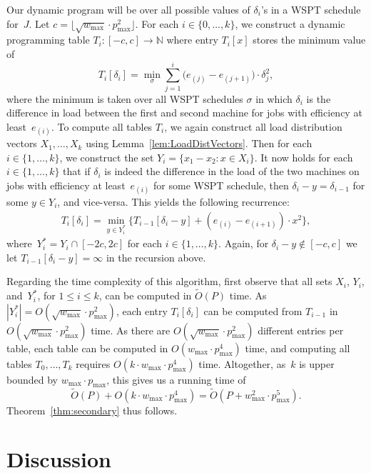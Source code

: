 \documentclass[11pt]{llncs}
\begin{document}
Our dynamic program will be over all possible values of $\delta_i$'s in a WSPT schedule for~$J$. Let $c = \lfloor \sqrt{w_{\max}} \cdot p^2_{\max} \rfloor$. For each $i \in \{0,\ldots,k\}$, we construct a dynamic programming table $T_i:[-c,c] \to \mathbb{N}$ where entry $T_i[x]$ stores the minimum value of
$$
T_i[\delta_i] = \min_{\sigma} \sum_{j = 1}^{i}   \big(e_{(j)}-e_{(j+1)}\big)  \cdot  \delta^2_j,
$$ 
where the minimum is taken over all WSPT schedules $\sigma$ in which $\delta_i$ is the difference in load between the first and second machine for jobs with efficiency at least~$e_{(i)}$. To compute all tables $T_i$, we again construct all load distribution vectors $X_1,\ldots,X_k$ using Lemma~\ref{lem:LoadDistVectors}. Then for each $i \in \{1,\ldots,k\}$, we construct the set $Y_i=\{x_1 - x_2 : x \in X_i\}$. It now holds for each $i \in \{1,\ldots,k\}$ that if $\delta_i$ is indeed the difference in the load of the two machines on jobs with efficiency at least~$e_{(i)}$ for some WSPT schedule, then $\delta_i - y= \delta_{i-1}$ for some $y \in Y_i$, and vice-versa. This yields the following recurrence:
\begin{align*}
T_i[\delta_i] = \min_{y \in Y^*_i} \Big\{T_{i-1}[\delta_i-y] + (e_{(i)}-e_{(i+1)}) \cdot x^2\Big\},
\end{align*}
where~$Y^*_i = Y_i \cap [-2c, 2c]$ for each $i \in \{1,\ldots,k\}$. Again, for $\delta_i-y \notin [-c, c]$ we let $T_{i-1}[\delta_i-y]=\infty$ in the recursion above.

Regarding the time complexity of this algorithm, first observe that all sets $X_i$, $Y_i$, and~$Y^*_i$, for $1 \leq i \leq k$, can be computed in $\widetilde{O}(P)$ time. As $|Y^*_i| = O(\sqrt{w_{\max}} \cdot p^2_{\max})$, each entry $T_i[\delta_i]$ can be computed from $T_{i-1}$ in $O(\sqrt{w_{\max}} \cdot p^2_{\max})$ time. As there are $O(\sqrt{w_{\max}} \cdot p^2_{\max})$ different entries per table, each table can be computed in $O(w_{\max} \cdot p^4_{\max})$ time, and computing all tables $T_0, \dots, T_{k}$ requires $O(k \cdot w_{\max} \cdot p^4_{\max})$ time. Altogether, as~$k$ is upper bounded by $w_{\max} \cdot p_{\max}$, this gives us a running time of 
$$
\widetilde{O}(P) + O(k \cdot w_{\max} \cdot p^4_{\max}) = \widetilde{O}(P+ w_{\max}^{2} \cdot p_{\max}^{5}).
$$ 
Theorem~\ref{thm:secondary} thus follows.

\section{Discussion}
\end{document}
